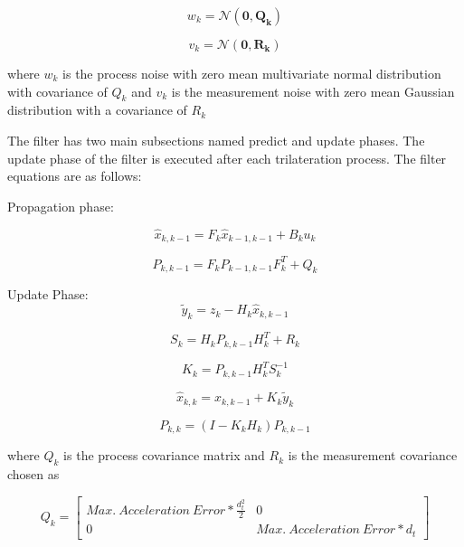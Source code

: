 \begin{equation}
 w_k = \mathcal{N}(\mathbf{0,Q_k})
\end{equation}
	
\begin{equation}
v_k = \mathcal{N}(\mathbf{0,R_k})
\end{equation}
		
where $w_k$ is the process noise with zero mean multivariate normal distribution with covariance of $Q_k$ and $v_k$ is the measurement noise with zero mean Gaussian distribution with a covariance of $R_k$
		
The filter has two main subsections named predict and update phases. The update phase of the filter is executed after each trilateration process. The filter equations are as follows:
		
Propagation phase:

\begin{equation}
\hat{x}_{k,k-1} = F_k\hat{x}_{k-1,k-1} + B_ku_k
\end{equation}
		
\begin{equation}
 P_{k,k-1} = F_k P_{k-1,k-1}F^T_k + Q_k
\end{equation}
		
Update Phase:
\begin{equation}
\tilde{y}_k = z_k - H_k  \hat{x}_{k,k-1} 
\end{equation}

\begin{equation}
S_k = H_k P_{k,k-1} H^T_k + R_k
\end{equation}

\begin{equation}
K_k =  P_{k,k-1} H^T_kS_k^{-1}
\end{equation}
		
\begin{equation}
 \hat{x}_{k,k} =  \hat{x}_{k,k-1} + K_k \tilde{y}_k
\end{equation}
		
\begin{equation}
P_{k,k} = (I - K_kH_k)P_{k,k-1}
\end{equation}
		
where $Q_k$ is the process covariance matrix and $R_k$ is the measurement covariance chosen as 

\begin{equation}
Q_k = \begin{bmatrix}
Max.\ Acceleration\ Error * \frac{d^2_t}{2} & 0 \\
0 & Max.\ Acceleration\ Error * d_t
\end{bmatrix}
\end{equation}
		
